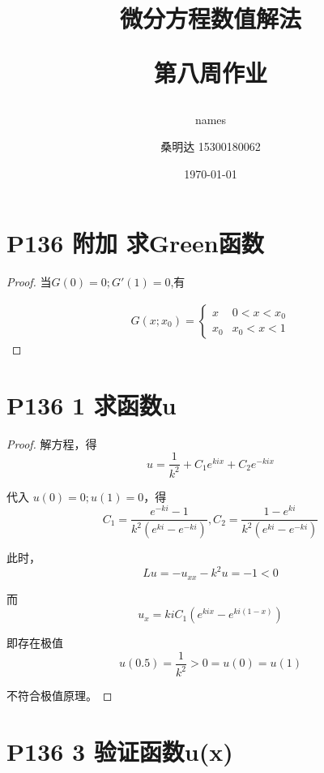 \documentclass{article}%
\author{names}
\title{\heiti 微分方程数值解法\\ [2ex] \begin{large} 第八周作业 \end{large}}
\author{\kaishu 桑明达 15300180062}
\date{\today}
\begin{document}
\maketitle


\section{P136 附加 求Green函数}

\begin{proof}

	当$ G\left ( 0 \right )=0;G'\left ( 1 \right )=0$,有

\begin{align*}
	G\left ( x;x_0 \right )=\left\{\begin{matrix}
x &0< x<x_0 \\
x_0 &x_0<x<1
\end{matrix}\right.
\end{align*}

\end{proof}


\section{P136 1 求函数u}

\begin{proof}

	解方程，得$$ u=\frac{1}{k^2}+C_1 e^{kix}+C_2 e^{-kix} $$

	代入	$ u\left ( 0 \right )=0;u\left ( 1 \right )=0$，得$$ C_1=\frac{e^{-ki}-1}{k^2\left ( e^{ki}-e^{-ki} \right )},C_2=\frac{1-e^{ki}}{k^2\left ( e^{ki}-e^{-ki} \right )} $$

	此时，$$ Lu=-u_{xx}-k^2u=-1<0 $$

	而 $$ u_{x}=kiC_1\left (e^{kix} -e^{ki\left ( 1-x \right )} \right ) $$

	即存在极值$$ u\left ( 0.5 \right )=\frac{1}{k^2}>0=u\left ( 0 \right )=u\left ( 1 \right ) $$

	不符合极值原理。

\end{proof}

\section{P136 3 验证函数u(x)}
\end{document}
